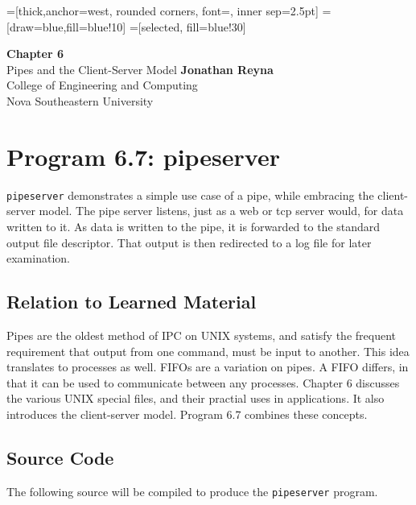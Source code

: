 \documentclass[letter,12pt,sffamily]{article}
\begin{document}
=[thick,anchor=west, rounded corners, font={\scriptsize\ttfamily}, inner sep=2.5pt]
=[draw=blue,fill=blue!10]
=[selected, fill=blue!30]

\begin{titlepage}
  \begin{center}
    \vspace*{1cm}
    \Huge
    \textbf{Chapter 6}\\
    \vspace{0.5cm}
    \LARGE
    Pipes and the Client-Server Model
    \vfill
    \Large
    \textbf{Jonathan Reyna}\\
    College of Engineering and Computing\\
    Nova Southeastern University\\
    \usdate{\today}
  \end{center}
\end{titlepage}
\tableofcontents
\pagebreak
\section{Program 6.7: pipeserver}
\texttt{pipeserver} demonstrates a simple use case of a pipe, while embracing the client-server model. The pipe server listens, just as a web or tcp server would, for data written to it. As data is written to the pipe, it is forwarded to the standard output file descriptor. That output is then redirected to a log file for later examination.
\subsection{Relation to Learned Material}
Pipes are the oldest method of IPC on UNIX systems, and satisfy the frequent requirement that output from one command, must be input to another. This idea translates to processes as well. FIFOs
are a variation on pipes. A FIFO differs, in that it can be used to communicate between any processes.
Chapter 6 discusses the various UNIX special files, and their practial uses in applications. It also introduces the client-server model. Program 6.7 combines these concepts.
\subsection{Source Code}
The following source will be compiled to produce the \texttt{pipeserver} program.
\renewcommand{\theFancyVerbLine}{
\sffamily\textcolor[rgb]{0.5,0.5,0.5}{\scriptsize\arabic{FancyVerbLine}}}
\end{document}
